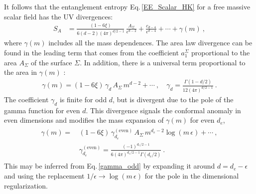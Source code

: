 It follows that the entanglement entropy Eq.\,\eqref{EE_Scalar_HK} for a free massive scalar field has the UV divergences:
\begin{align}\label{EAfinite}
S_A &= \frac{(1-6\xi)}{6(d-2) (4\pi)^{d/2 -1}} \,\frac{A_\Sigma}{\epsilon^{d-2}} + \frac{c_{d-4}}{\epsilon^{d-4}}  + \cdots +\gamma(m) \ ,
\end{align}
where $\gamma(m)$ includes all the mass dependences.
The area law divergence can be found in the leading term that comes from the coefficient $a_1^\Sigma$ proportional to the area $A_\Sigma$ of the surface $\Sigma$. 
In addition, there is a universal term proportional to the area in $\gamma(m)$ \cite{Hertzberg:2010uv}:
\begin{align}\label{gamma_odd}
	\gamma(m) = (1-6\xi)\,\gamma_d \, A_\Sigma\, m^{d-2} + \cdots \ ,\quad \gamma_d = 	\frac{\Gamma(1-d/2)}{12(4\pi)^{d/2-1}} \ .
\end{align}
The coefficient $\gamma_d$ is finite for odd $d$, but is divergent due to the pole of the gamma function for even $d$.
This divergence signals the conformal anomaly in even dimensions and modifies the mass expansion of $\gamma(m)$  for even $d_e$,
\begin{align}
\begin{aligned}
	\gamma(m) =\,& (1-6\xi)\,\gamma_{d_e}^{(\text{even})}\, A_\Sigma\, m^{d_e-2}\log (m\,\epsilon) + \cdots \ , \\
	&\gamma_{d_e}^{(\text{even})} = \frac{(-1)^{d_e/2 -1}}{6(4\pi)^{d_e/2 -1} \Gamma (d_e/2)}  \ .
\end{aligned}
\end{align}
This may be inferred from Eq.\,\eqref{gamma_odd} by expanding it around $d = d_e - \epsilon$  and using the replacement $1/\epsilon \to \log (m\, \epsilon)$ for the pole in the dimensional regularization.



\endinput